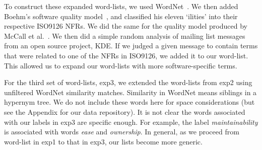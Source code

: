 \documentclass[smallextended]{svjour3}       %
\begin{document}
To construct these expanded word-lists, we used
WordNet~\cite{Fellbaum1998}.
We then added Boehm's software quality model~\cite{Boehm+:1976:ICSE}, and classified his eleven `ilities' into their respective ISO9126 NFRs. 
We did the same for the quality model produced by McCall et al.~\cite{mccall1977}. 
We then did a simple random analysis of mailing list messages from an open source project, KDE. If we judged a given message to contain terms that were related to one of the NFRs in ISO9126, we added it to our word-list. This allowed us to expand our word-lists with more software-specific terms.

For the third set of word-lists, \textsf{exp3}, we extended the word-lists from \textsf{exp2} using unfiltered WordNet similarity matches. 
Similarity in WordNet means siblings in a hypernym tree. 
We do not include these words here for space considerations (but see the Appendix for our data repository). 
It is not clear the words associated with our labels in \textsf{exp3} are specific enough. For example, the label \emph{maintainability} is associated with words \emph{ease} and \emph{ownership}. In general, as we proceed from word-list in \textsf{exp1} to that in \textsf{exp3}, our lists become more generic.
\end{document}
